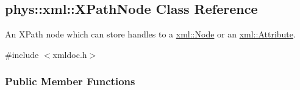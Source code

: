 \hypertarget{classphys_1_1xml_1_1XPathNode}{
\subsection{phys::xml::XPathNode Class Reference}
\label{classphys_1_1xml_1_1XPathNode}
}


An XPath node which can store handles to a \hyperlink{classphys_1_1xml_1_1Node}{xml::Node} or an \hyperlink{classphys_1_1xml_1_1Attribute}{xml::Attribute}.  




{\ttfamily \#include $<$xmldoc.h$>$}

\subsubsection*{Public Member Functions}
